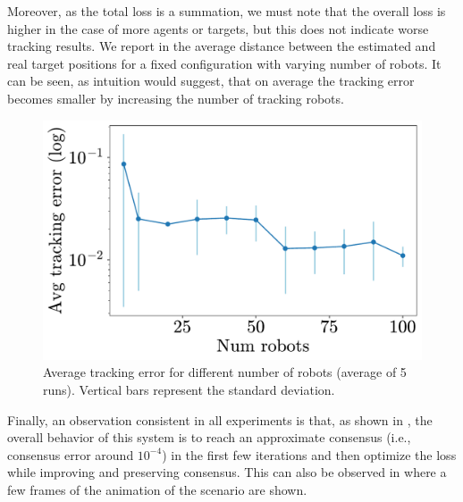 \documentclass[a4paper,11pt,oneside]{book}
\begin{document}
Moreover, as the total loss is a summation, we must note that the overall loss is higher in the case of more agents or targets, but this does not indicate worse tracking results. We report in  the average distance between the estimated and real target positions for a fixed configuration with varying number of robots. It can be seen, as intuition would suggest, that on average the tracking error becomes smaller by increasing the number of tracking robots.

\begin{figure}[H]
      \centering
      \includegraphics[width=0.46\linewidth]{./figs/tracking/average/avg_tracking.pdf}
      \caption{Average tracking error for different number of robots (average of 5 runs). Vertical bars represent the standard deviation.}
      \label{fig:tracking_avg_error_runs}
\end{figure}


Finally, an observation consistent in all experiments is that, as shown in , the overall behavior of this system is to reach an approximate consensus (i.e., consensus error around $10^{-4}$) in the first few iterations and then optimize the loss while improving and preserving consensus. This can also be observed in  where a few frames of the animation of the scenario are shown.
\end{document}
